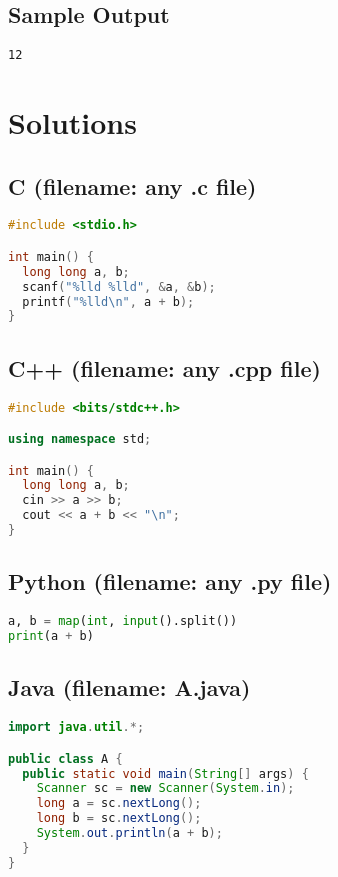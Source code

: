 \documentclass[12pt,a4paper]{article}
\begin{document}
\subsection*{Sample Output}
\begin{verbatim}
12
\end{verbatim}

\section*{Solutions}

\subsection*{C (filename: any .c file)}
\begin{lstlisting}[language=C]
#include <stdio.h>

int main() {
  long long a, b;
  scanf("%lld %lld", &a, &b);
  printf("%lld\n", a + b);
}
\end{lstlisting}

\subsection*{C++ (filename: any .cpp file)}
\begin{lstlisting}[language=C++]
#include <bits/stdc++.h>

using namespace std;

int main() {
  long long a, b;
  cin >> a >> b;
  cout << a + b << "\n";
}
\end{lstlisting}

\subsection*{Python (filename: any .py file)}
\begin{lstlisting}[language=Python]
a, b = map(int, input().split())
print(a + b)
\end{lstlisting}

\subsection*{Java (filename: A.java)}
\begin{lstlisting}[language=Java]
import java.util.*;

public class A {
  public static void main(String[] args) {
    Scanner sc = new Scanner(System.in);
    long a = sc.nextLong();
    long b = sc.nextLong();
    System.out.println(a + b);
  }
}
\end{lstlisting}
\end{document}
